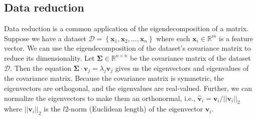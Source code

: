 \documentclass{article}[11pt]
\def\D{\mathcal{D}}
\newcommand{\norm}[1]{\left|\left|#1\right|\right|}
\begin{document}
\subsection*{Data reduction}
Data reduction is a common application of the eigendecomposition of a matrix. Suppose we have a dataset $\D = \left\{\mathbf{x}_{1},\mathbf{x}_{2},\dots,\mathbf{x}_{n}\right\}$ where each $\mathbf{x}_{i}\in\mathbb{R}^{m}$ is a feature vector.
We can use the eigendecomposition of the dataset's covariance matrix to reduce its dimensionality. Let $\mathbf{\Sigma}\in\mathbb{R}^{n\times{n}}$ be the covariance matrix of the dataset $\D$. Then the equation $\mathbf{\Sigma}\cdot\mathbf{v}_{j} = \lambda_{j}\mathbf{v}_{j}$ gives us the eigenvectors and eigenvalues of the covariance matrix. Because the covariance matrix is symmetric, the eigenvectors are orthogonal, and the eigenvalues are real-valued.
Further, we can normalize the eigenvectors to make them an orthonormal, i.e., $\hat{\mathbf{v}}_{i} = \mathbf{v}_{i}/\norm{\mathbf{v}_{i}}_{2}$ where $\norm{\mathbf{v}_{i}}_{2}$ is the $l2$-norm (Euclidean length) of the eigenvector $\mathbf{v}_{i}$.
\end{document}
